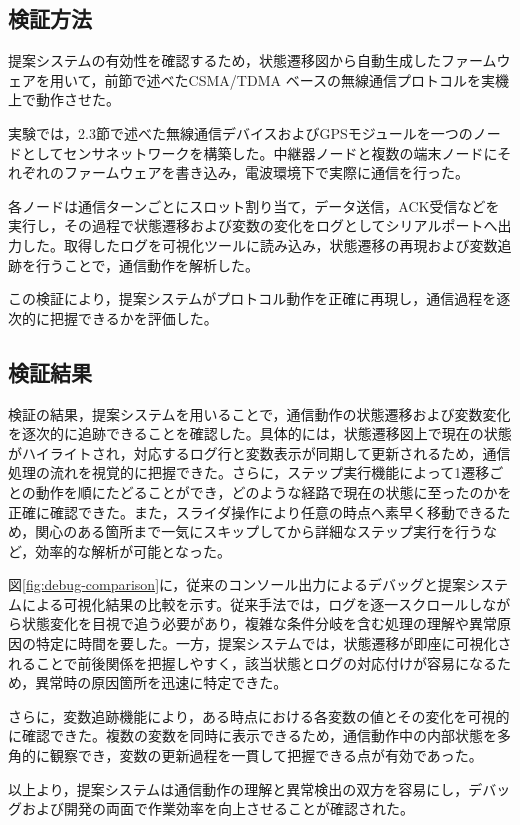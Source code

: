 \documentclass[technicalreport]{ieicej}
\begin{document}
\subsection{検証方法}
提案システムの有効性を確認するため，状態遷移図から自動生成したファームウェアを用いて，前節で述べたCSMA/TDMA ベースの無線通信プロトコルを実機上で動作させた。 

実験では，2.3節で述べた無線通信デバイスおよびGPSモジュールを一つのノードとしてセンサネットワークを構築した。中継器ノードと複数の端末ノードにそれぞれのファームウェアを書き込み，電波環境下で実際に通信を行った。 

各ノードは通信ターンごとにスロット割り当て，データ送信，ACK受信などを実行し，その過程で状態遷移および変数の変化をログとしてシリアルポートへ出力した。取得したログを可視化ツールに読み込み，状態遷移の再現および変数追跡を行うことで，通信動作を解析した。

この検証により，提案システムがプロトコル動作を正確に再現し，通信過程を逐次的に把握できるかを評価した。

\subsection{検証結果}
検証の結果，提案システムを用いることで，通信動作の状態遷移および変数変化を逐次的に追跡できることを確認した。具体的には，状態遷移図上で現在の状態がハイライトされ，対応するログ行と変数表示が同期して更新されるため，通信処理の流れを視覚的に把握できた。さらに，ステップ実行機能によって1遷移ごとの動作を順にたどることができ，どのような経路で現在の状態に至ったのかを正確に確認できた。また，スライダ操作により任意の時点へ素早く移動できるため，関心のある箇所まで一気にスキップしてから詳細なステップ実行を行うなど，効率的な解析が可能となった。

 図\ref{fig:debug-comparison}に，従来のコンソール出力によるデバッグと提案システムによる可視化結果の比較を示す。従来手法では，ログを逐一スクロールしながら状態変化を目視で追う必要があり，複雑な条件分岐を含む処理の理解や異常原因の特定に時間を要した。一方，提案システムでは，状態遷移が即座に可視化されることで前後関係を把握しやすく，該当状態とログの対応付けが容易になるため，異常時の原因箇所を迅速に特定できた。
 
 さらに，変数追跡機能により，ある時点における各変数の値とその変化を可視的に確認できた。複数の変数を同時に表示できるため，通信動作中の内部状態を多角的に観察でき，変数の更新過程を一貫して把握できる点が有効であった。 
 
 以上より，提案システムは通信動作の理解と異常検出の双方を容易にし，デバッグおよび開発の両面で作業効率を向上させることが確認された。
\end{document}
